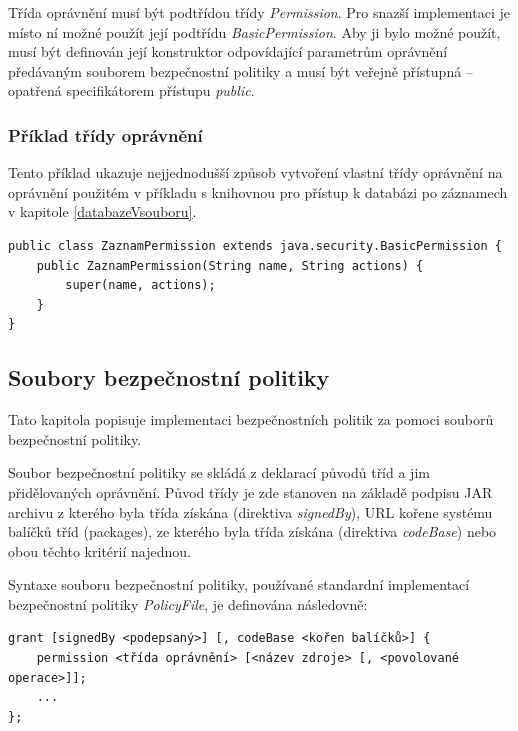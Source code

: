 Třída oprávnění musí být podtřídou třídy {\it Permission}. Pro snazší implementaci je místo ní možné použít její podtřídu {\it BasicPermission}.
Aby ji bylo možné použít, musí být definován její konstruktor odpovídající parametrům oprávnění předávaným souborem bezpečnostní politiky a musí být veřejně přístupná -- opatřená specifikátorem přístupu {\it public}.

\subsubsection{Příklad třídy oprávnění}

Tento příklad ukazuje nejjednodušší způsob vytvoření vlastní třídy oprávnění na oprávnění použitém v příkladu s knihovnou pro přístup k databázi po záznamech v kapitole \ref{databazeVsouboru}.

\begin{verbatim}
public class ZaznamPermission extends java.security.BasicPermission {
    public ZaznamPermission(String name, String actions) {
        super(name, actions);
    }
}
\end{verbatim}

\subsection{Soubory bezpečnostní politiky}

Tato kapitola popisuje implementaci bezpečnostních politik za pomoci souborů bezpečnostní politiky.

Soubor bezpečnostní politiky se skládá z deklarací původů tříd a jim přidělovaných oprávnění.
Původ třídy je zde stanoven na základě podpisu JAR archivu z kterého byla třída získána (direktiva {\it signedBy}), URL kořene systému balíčků tříd (packages), ze kterého byla třída získána (direktiva {\it codeBase}) nebo obou těchto kritérií najednou. \cite[5.3.1]{oaks}

Syntaxe souboru bezpečnostní politiky, používané standardní implementací bezpečnostní politiky {\it PolicyFile}, je definována následovně: \cite[5.3.1]{oaks}

\begin{verbatim}
grant [signedBy <podepsaný>] [, codeBase <kořen balíčků>] {
    permission <třída oprávnění> [<název zdroje> [, <povolované operace>]];
    ...
};
\end{verbatim}

